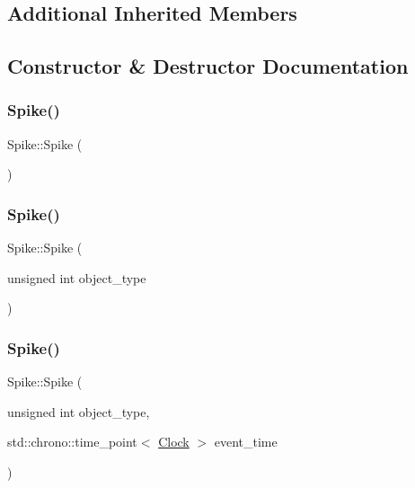 \subsection*{Additional Inherited Members}


\subsection{Constructor \& Destructor Documentation}
\mbox{\label{classSpike_a1f82ea9e43a3a71b878261753c722dd9}} 
\subsubsection{\texorpdfstring{Spike()}{Spike()}\hspace{0.1cm}{\footnotesize\ttfamily [1/4]}}
{\footnotesize\ttfamily Spike\+::\+Spike (\begin{DoxyParamCaption}{ }\end{DoxyParamCaption})\hspace{0.3cm}{\ttfamily [inline]}}

\mbox{\label{classSpike_a3e6dbba4e235f7adb02ade45c918b266}} 
\subsubsection{\texorpdfstring{Spike()}{Spike()}\hspace{0.1cm}{\footnotesize\ttfamily [2/4]}}
{\footnotesize\ttfamily Spike\+::\+Spike (\begin{DoxyParamCaption}\item[{unsigned int}]{object\+\_\+type }\end{DoxyParamCaption})\hspace{0.3cm}{\ttfamily [inline]}}

\mbox{\label{classSpike_a9368fb7b20887e5f02f3de6176f04c02}} 
\subsubsection{\texorpdfstring{Spike()}{Spike()}\hspace{0.1cm}{\footnotesize\ttfamily [3/4]}}
{\footnotesize\ttfamily Spike\+::\+Spike (\begin{DoxyParamCaption}\item[{unsigned int}]{object\+\_\+type,  }\item[{std\+::chrono\+::time\+\_\+point$<$ \mbox{\hyperlink{universe_8h_a0ef8d951d1ca5ab3cfaf7ab4c7a6fd80}{Clock}} $>$}]{event\+\_\+time }\end{DoxyParamCaption})\hspace{0.3cm}{\ttfamily [inline]}}

